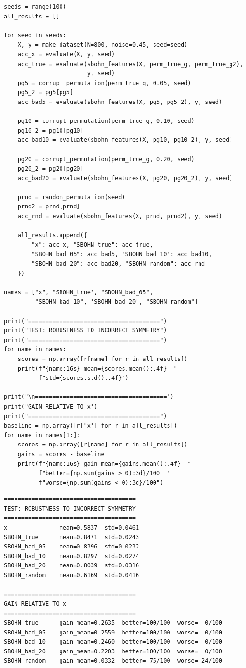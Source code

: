 \documentclass[11pt,a4paper]{report}
\begin{document}
\begin{lstlisting}[caption=SBOHN Experiment 8: robustness to incorrect symmetry]
seeds = range(100)
all_results = []

for seed in seeds:
    X, y = make_dataset(N=800, noise=0.45, seed=seed)
    acc_x = evaluate(X, y, seed)
    acc_true = evaluate(sbohn_features(X, perm_true_g, perm_true_g2),
                        y, seed)
    pg5 = corrupt_permutation(perm_true_g, 0.05, seed)
    pg5_2 = pg5[pg5]
    acc_bad5 = evaluate(sbohn_features(X, pg5, pg5_2), y, seed)

    pg10 = corrupt_permutation(perm_true_g, 0.10, seed)
    pg10_2 = pg10[pg10]
    acc_bad10 = evaluate(sbohn_features(X, pg10, pg10_2), y, seed)

    pg20 = corrupt_permutation(perm_true_g, 0.20, seed)
    pg20_2 = pg20[pg20]
    acc_bad20 = evaluate(sbohn_features(X, pg20, pg20_2), y, seed)

    prnd = random_permutation(seed)
    prnd2 = prnd[prnd]
    acc_rnd = evaluate(sbohn_features(X, prnd, prnd2), y, seed)

    all_results.append({
        "x": acc_x, "SBOHN_true": acc_true,
        "SBOHN_bad_05": acc_bad5, "SBOHN_bad_10": acc_bad10,
        "SBOHN_bad_20": acc_bad20, "SBOHN_random": acc_rnd
    })

names = ["x", "SBOHN_true", "SBOHN_bad_05",
         "SBOHN_bad_10", "SBOHN_bad_20", "SBOHN_random"]

print("======================================")
print("TEST: ROBUSTNESS TO INCORRECT SYMMETRY")
print("======================================")
for name in names:
    scores = np.array([r[name] for r in all_results])
    print(f"{name:16s} mean={scores.mean():.4f}  "
          f"std={scores.std():.4f}")

print("\n======================================")
print("GAIN RELATIVE TO x")
print("======================================")
baseline = np.array([r["x"] for r in all_results])
for name in names[1:]:
    scores = np.array([r[name] for r in all_results])
    gains = scores - baseline
    print(f"{name:16s} gain_mean={gains.mean():.4f}  "
          f"better={np.sum(gains > 0):3d}/100  "
          f"worse={np.sum(gains < 0):3d}/100")
\end{lstlisting}

\label{app:ch3-lst18}
\begin{lstlisting}[style=textstyle, caption=Result of SBOHN-8 experiment]
======================================
TEST: ROBUSTNESS TO INCORRECT SYMMETRY
======================================
x               mean=0.5837  std=0.0461
SBOHN_true      mean=0.8471  std=0.0243
SBOHN_bad_05    mean=0.8396  std=0.0232
SBOHN_bad_10    mean=0.8297  std=0.0274
SBOHN_bad_20    mean=0.8039  std=0.0316
SBOHN_random    mean=0.6169  std=0.0416

======================================
GAIN RELATIVE TO x
======================================
SBOHN_true      gain_mean=0.2635  better=100/100  worse=  0/100
SBOHN_bad_05    gain_mean=0.2559  better=100/100  worse=  0/100
SBOHN_bad_10    gain_mean=0.2460  better=100/100  worse=  0/100
SBOHN_bad_20    gain_mean=0.2203  better=100/100  worse=  0/100
SBOHN_random    gain_mean=0.0332  better= 75/100  worse= 24/100
\end{lstlisting}
\end{document}
